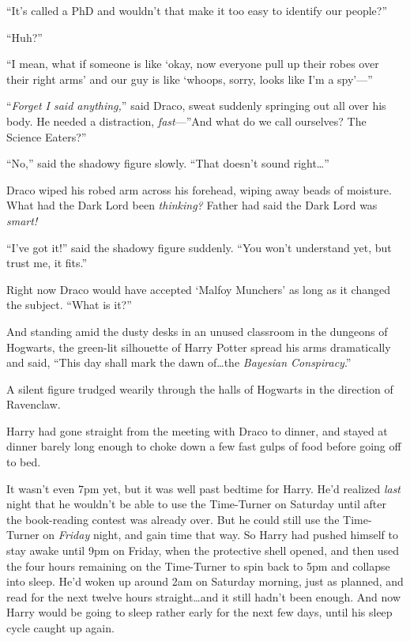 “It’s called a PhD and wouldn’t that make it too easy to identify our people?”

“Huh?”

“I mean, what if someone is like ‘okay, now everyone pull up their robes over their right arms’ and our guy is like ‘whoops, sorry, looks like I’m a spy’—”

“\emph{Forget I said anything,}” said Draco, sweat suddenly springing out all over his body. He needed a distraction, \emph{fast}—”And what do we call ourselves? The Science Eaters?”

“No,” said the shadowy figure slowly. “That doesn’t sound right…”

Draco wiped his robed arm across his forehead, wiping away beads of moisture. What had the Dark Lord been \emph{thinking?} Father had said the Dark Lord was \emph{smart!}

“I’ve got it!” said the shadowy figure suddenly. “You won’t understand yet, but trust me, it fits.”

Right now Draco would have accepted ‘Malfoy Munchers’ as long as it changed the subject. “What is it?”

And standing amid the dusty desks in an unused classroom in the dungeons of Hogwarts, the green-lit silhouette of Harry Potter spread his arms dramatically and said, “This day shall mark the dawn of…the \emph{Bayesian Conspiracy}.”

\later

A silent figure trudged wearily through the halls of Hogwarts in the direction of Ravenclaw.

Harry had gone straight from the meeting with Draco to dinner, and stayed at dinner barely long enough to choke down a few fast gulps of food before going off to bed.

It wasn’t even 7pm yet, but it was well past bedtime for Harry. He’d realized \emph{last} night that he wouldn’t be able to use the Time-Turner on Saturday until after the book-reading contest was already over. But he could still use the Time-Turner on \emph{Friday} night, and gain time that way. So Harry had pushed himself to stay awake until 9pm on Friday, when the protective shell opened, and then used the four hours remaining on the Time-Turner to spin back to 5pm and collapse into sleep. He’d woken up around 2am on Saturday morning, just as planned, and read for the next twelve hours straight…and it still hadn’t been enough. And now Harry would be going to sleep rather early for the next few days, until his sleep cycle caught up again.

